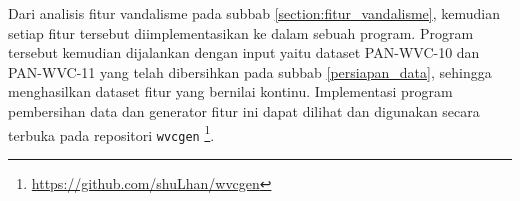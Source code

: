 Dari analisis fitur vandalisme pada subbab \ref{section:fitur_vandalisme},
kemudian setiap fitur tersebut diimplementasikan ke dalam sebuah program.
Program tersebut kemudian dijalankan dengan input yaitu dataset PAN-WVC-10
dan PAN-WVC-11 yang telah dibersihkan pada subbab \ref{persiapan_data},
sehingga menghasilkan dataset fitur yang bernilai kontinu.
Implementasi program pembersihan data dan generator fitur ini dapat dilihat dan
digunakan secara terbuka pada repositori \texttt{wvcgen}
\footnote{\url{https://github.com/shuLhan/wvcgen}}.
